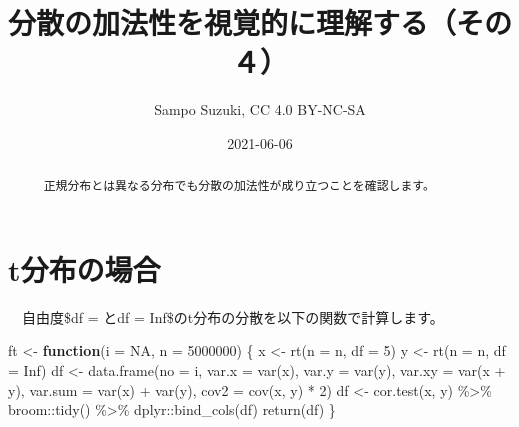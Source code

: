 \documentclass[a4paper]{tufte-handout}
\title[分散の加法性を視覚的に理解する（その４）]{分散の加法性を視覚的に理解する（その４）}
\author{Sampo Suzuki, CC 4.0 BY-NC-SA}
\date{2021-06-06}
\newenvironment{Shaded}{}{}
\newcommand{\AttributeTok}[1]{\textcolor[rgb]{0.49,0.56,0.16}{#1}}
\newcommand{\ConstantTok}[1]{\textcolor[rgb]{0.53,0.00,0.00}{#1}}
\newcommand{\ControlFlowTok}[1]{\textcolor[rgb]{0.00,0.44,0.13}{\textbf{#1}}}
\newcommand{\DecValTok}[1]{\textcolor[rgb]{0.25,0.63,0.44}{#1}}
\newcommand{\FunctionTok}[1]{\textcolor[rgb]{0.02,0.16,0.49}{#1}}
\newcommand{\NormalTok}[1]{#1}
\newcommand{\OtherTok}[1]{\textcolor[rgb]{0.00,0.44,0.13}{#1}}
\newcommand{\SpecialCharTok}[1]{\textcolor[rgb]{0.25,0.44,0.63}{#1}}
\begin{document}
\maketitle

\begin{abstract}
\noindent 　正規分布とは異なる分布でも分散の加法性が成り立つことを確認します。
\end{abstract}



\hypertarget{tux5206ux5e03ux306eux5834ux5408}{%
\section{\texorpdfstring{\textbf{t分布の場合}}{t分布の場合}}\label{tux5206ux5e03ux306eux5834ux5408}}

　自由度\$df = \(と\)df = Inf\$のt分布の分散を以下の関数で計算します。

\begin{Shaded}
\begin{Highlighting}[numbers=left,,]
\NormalTok{ft }\OtherTok{\textless{}{-}} \ControlFlowTok{function}\NormalTok{(}\AttributeTok{i =} \ConstantTok{NA}\NormalTok{, }\AttributeTok{n =} \DecValTok{5000000}\NormalTok{) \{}
\NormalTok{  x }\OtherTok{\textless{}{-}} \FunctionTok{rt}\NormalTok{(}\AttributeTok{n =}\NormalTok{ n, }\AttributeTok{df =} \DecValTok{5}\NormalTok{)}
\NormalTok{  y }\OtherTok{\textless{}{-}} \FunctionTok{rt}\NormalTok{(}\AttributeTok{n =}\NormalTok{ n, }\AttributeTok{df =} \ConstantTok{Inf}\NormalTok{)}
\NormalTok{  df }\OtherTok{\textless{}{-}} \FunctionTok{data.frame}\NormalTok{(}\AttributeTok{no =}\NormalTok{ i,}
                   \AttributeTok{var.x =} \FunctionTok{var}\NormalTok{(x), }\AttributeTok{var.y =} \FunctionTok{var}\NormalTok{(y),}
                   \AttributeTok{var.xy =} \FunctionTok{var}\NormalTok{(x }\SpecialCharTok{+}\NormalTok{ y), }\AttributeTok{var.sum =} \FunctionTok{var}\NormalTok{(x) }\SpecialCharTok{+} \FunctionTok{var}\NormalTok{(y),}
                   \AttributeTok{cov2 =} \FunctionTok{cov}\NormalTok{(x, y) }\SpecialCharTok{*} \DecValTok{2}\NormalTok{)}
\NormalTok{  df }\OtherTok{\textless{}{-}} \FunctionTok{cor.test}\NormalTok{(x, y) }\SpecialCharTok{\%\textgreater{}\%}\NormalTok{ broom}\SpecialCharTok{::}\FunctionTok{tidy}\NormalTok{() }\SpecialCharTok{\%\textgreater{}\%}\NormalTok{ dplyr}\SpecialCharTok{::}\FunctionTok{bind\_cols}\NormalTok{(df)}
  \FunctionTok{return}\NormalTok{(df)}
\NormalTok{\}}
\end{Highlighting}
\end{Shaded}
\end{document}
